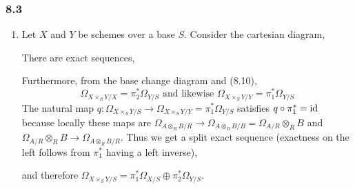 \documentclass[12pt]{article}
\begin{document}
\subsubsection{8.3}

\begin{enumerate}
\item Let $X$ and $Y$ be schemes over a base $S$. Consider the cartesian diagram,
\begin{center}
\end{center}
There are exact sequences,
\begin{center}
\end{center}
Furthermore, from the base change diagram and (8.10),
\[ \Omega_{X \times_S Y/X} = \pi_2^* \Omega_{Y/S} \text{ and likewise } \Omega_{X \times_S Y/Y} = \pi_1^* \Omega_{Y/S} \]
The natural map $q : \Omega_{X \times_S Y/S} \to \Omega_{X \times_S Y/Y} = \pi_1^* \Omega_{Y/S}$ satisfies $q \circ \pi_1^* = \mathrm{id}$ because locally these maps are $\Omega_{A \otimes_R B/R} \to \Omega_{A \otimes_R B/B} = \Omega_{A/R} \otimes_R B$ and $\Omega_{A/R} \otimes_R B \to \Omega_{A \otimes_R B/R}$.
Thus we get a split exact sequence (exactness on the left follows from $\pi_1^*$ having a left inverse),
\begin{center}
\end{center} 
and therefore $\Omega_{X \times_S Y/S} = \pi_1^* \Omega_{X/S} \oplus \pi_2^* \Omega_{Y/S}$.


\end{enumerate}
\end{document}
